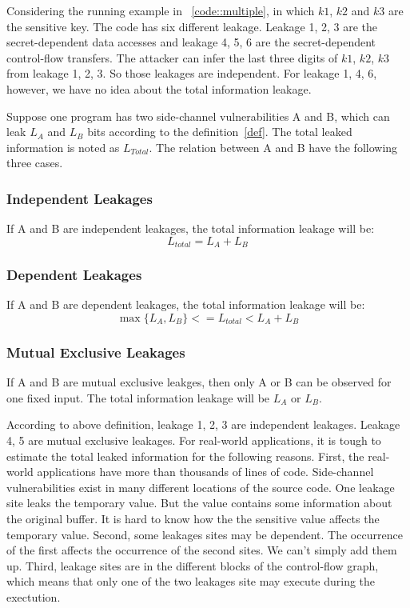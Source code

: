                 

Considering the running example in ~\ref{code::multiple}, in which $k1$, $k2$ and $k3$ are
the sensitive key. The code has six different leakage. Leakage 1, 2, 3 are the secret-dependent
data accesses and leakage 4, 5, 6 are the secret-dependent control-flow transfers.  
The attacker can infer the last three digits of
$k1$, $k2$, $k3$ from leakage 1, 2, 3. So those leakages are independent. For leakage 1, 4, 6, however,
we have no idea about the total information leakage.


Suppose one program has two side-channel vulnerabilities A and B, which can leak $L_A$ and $L_B$ bits
according to the definition~\ref{def}. 
The total leaked information is noted as $L_{Total}$. The relation between A and B have the following three cases. 

\subsubsection{Independent Leakages}
If A and B are independent leakages, the total information leakage will be:
$$L_{total} = L_A + L_B $$

\subsubsection{Dependent Leakages}
If A and B are dependent leakages, the total information leakage will be:
$$\max{\{L_A, L_B\}}  <= L_{total} < L_A + L_B$$

\subsubsection{Mutual Exclusive Leakages}
If A and B are mutual exclusive leakges, then only A or B can be observed for one fixed input.
The total information leakage will be $L_A$ or $L_B$.

According to above definition, leakage 1, 2, 3 are independent leakages. Leakage 4, 5
are mutual exclusive leakages. 
For real-world applications, it is tough to estimate the total leaked information for the following reasons.
First, the real-world applications have more than thousands of lines of code. Side-channel vulnerabilities
exist in many different locations of the source code. One leakage site leaks the temporary value. 
But the value contains some information about the original buffer. It is hard to know how the 
the sensitive value affects the temporary value. Second, some leakages sites may be
dependent. The occurrence of the first affects the occurrence of the second sites. We 
can't simply add them up. Third, leakage sites are in the different blocks of the 
control-flow graph, which means that only one of the two leakages site may execute
during the exectution.

